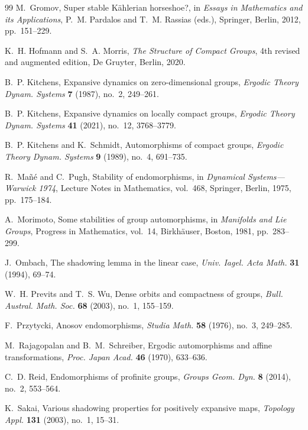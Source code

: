 \documentclass[12pt]{amsart}
\theoremstyle{definition}
\numberwithin{equation}{section}
\theoremstyle{remark}
\begin{document}
\begin{thebibliography}{99}
M.~Gromov,
Super stable K\"ahlerian horseshoe?,
in \emph{Essays in Mathematics and its Applications},
P.~M. Pardalos and T.~M. Rassias (eds.),
Springer, Berlin, 2012, pp.~151--229.

K.~H. Hofmann and S.~A. Morris,
\emph{The Structure of Compact Groups},
4th revised and augmented edition,
De Gruyter, Berlin, 2020.

B.~P. Kitchens,
Expansive dynamics on zero-dimensional groups,
\emph{Ergodic Theory Dynam. Systems} \textbf{7} (1987), no.~2, 249--261.

B.~P. Kitchens,
Expansive dynamics on locally compact groups,
\emph{Ergodic Theory Dynam. Systems} \textbf{41} (2021), no.~12,
3768--3779.

B.~P. Kitchens and K.~Schmidt,
Automorphisms of compact groups,
\emph{Ergodic Theory Dynam. Systems} \textbf{9} (1989), no.~4, 691--735.

R.~Ma\~n\'e and C.~Pugh,
Stability of endomorphisms,
in \emph{Dynamical Systems---Warwick 1974},
Lecture Notes in Mathematics, vol.~468,
Springer, Berlin, 1975, pp.~175--184.

A.~Morimoto,
Some stabilities of group automorphisms,
in \emph{Manifolds and Lie Groups},
Progress in Mathematics, vol.~14,
Birkh\"auser, Boston, 1981, pp.~283--299.

J.~Ombach,
The shadowing lemma in the linear case,
\emph{Univ. Iagel. Acta Math.} \textbf{31} (1994), 69--74.

W.~H. Previts and T.~S. Wu,
Dense orbits and compactness of groups,
\emph{Bull. Austral. Math. Soc.} \textbf{68} (2003), no.~1, 155--159.

F.~Przytycki,
Anosov endomorphisms,
\emph{Studia Math.} \textbf{58} (1976), no.~3, 249--285.

M.~Rajagopalan and B.~M.~Schreiber,
Ergodic automorphisms and affine transformations,
\emph{Proc. Japan Acad.} \textbf{46} (1970), 633--636.

C.~D. Reid,
Endomorphisms of profinite groups,
\emph{Groups Geom. Dyn.} \textbf{8} (2014), no.~2, 553--564.

K.~Sakai,
Various shadowing properties for positively expansive maps,
\emph{Topology Appl.} \textbf{131} (2003), no.~1, 15--31.


\end{thebibliography}
\end{document}
